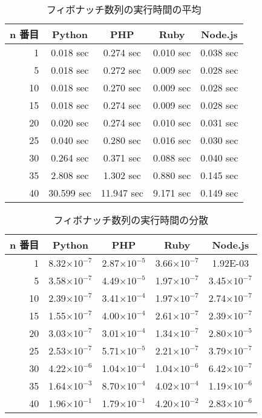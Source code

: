 \begin{table}[tbp]
\centering
\caption{フィボナッチ数列の実行時間の平均}
\label{table:f-average}
\begin{tabular}{|r||c|c|c|c|}
\hline
n 番目 & Python & PHP &Ruby	&Node.js \\ \hline \hline
1	&0.018 sec	&0.274 sec	&0.010 sec	&0.038 sec \\ \hline
5	&0.018 sec	&0.272 sec	&0.009 sec	&0.028 sec \\ \hline
10	&0.018 sec	&0.270 sec	&0.009 sec	&0.028 sec \\ \hline
15	&0.018 sec	&0.274 sec	&0.009 sec	&0.028 sec \\ \hline
20	&0.020 sec	&0.274 sec	&0.010 sec	&0.031 sec \\ \hline
25	&0.040 sec	&0.280 sec	&0.016 sec	&0.030 sec \\ \hline
30	&0.264 sec	&0.371 sec	&0.088 sec	&0.040 sec \\ \hline
35	&2.808 sec	&1.302 sec	&0.880 sec	&0.145 sec \\ \hline
40	&30.599	sec &11.947 sec	&9.171 sec	&0.149 sec \\ \hline
\end{tabular}
\end{table}

\begin{table}[tbp]
\centering
\caption{フィボナッチ数列の実行時間の分散}
\label{table:f-dispersion}
\begin{tabular}{|r||c|c|c|c|}
\hline
n 番目	&Python	&PHP	&Ruby	&Node.js\\ \hline \hline
1	&8.32$\times 10^{-7}$	&2.87$\times 10^{-5}$	&3.66$\times 10^{-7}$	&1.92E-03\\ \hline
5	&3.58$\times 10^{-7}$	&4.49$\times 10^{-5}$	&1.97$\times 10^{-7}$	&3.45$\times 10^{-7}$\\ \hline
10	&2.39$\times 10^{-7}$	&3.41$\times 10^{-4}$	&1.97$\times 10^{-7}$	&2.74$\times 10^{-7}$\\ \hline
15	&1.55$\times 10^{-7}$	&4.00$\times 10^{-4}$	&2.61$\times 10^{-7}$	&2.39$\times 10^{-7}$\\ \hline
20	&3.03$\times 10^{-7}$	&3.01$\times 10^{-4}$	&1.34$\times 10^{-7}$	&2.80$\times 10^{-5}$\\ \hline
25	&2.53$\times 10^{-7}$	&5.71$\times 10^{-5}$	&2.21$\times 10^{-7}$	&3.79$\times 10^{-7}$\\ \hline
30	&4.22$\times 10^{-6}$	&1.04$\times 10^{-4}$	&1.04$\times 10^{-6}$	&6.42$\times 10^{-7}$\\ \hline
35	&1.64$\times 10^{-3}$	&8.70$\times 10^{-4}$	&4.02$\times 10^{-4}$	&1.19$\times 10^{-6}$\\ \hline
40	&1.96$\times 10^{-1}$	&1.79$\times 10^{-1}$	&4.20$\times 10^{-2}$	&2.83$\times 10^{-6}$\\ \hline
\end{tabular}
\end{table}

